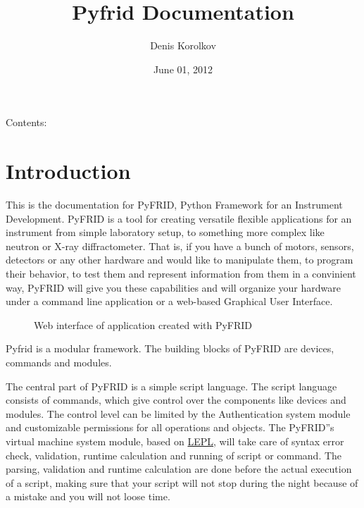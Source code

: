 \documentclass[letterpaper,10pt,english]{sphinxmanual}
\title{Pyfrid Documentation}
\date{June 01, 2012}
\author{Denis Korolkov}
\begin{document}
\maketitle
\tableofcontents
{}\label{index::doc}


Contents:


\chapter{Introduction}
\label{intro:introduction}\label{intro::doc}\label{intro:welcome-to-pyfrid-s-documentation}
This is the documentation for PyFRID, Python Framework for an Instrument Development.
PyFRID is a tool for creating versatile flexible applications for an instrument from simple
laboratory setup, to something more complex like neutron or X-ray diffractometer.
That is, if you have a bunch of motors, sensors, detectors or any other hardware and would like
to manipulate them, to program their behavior, to test them and represent information from them in a convinient way,
PyFRID will give you these capabilities and will organize your hardware under a command line application
or a web-based Graphical User Interface.
\begin{figure}[htbp]\begin{flushright}
\capstart

\caption{Web interface of application created with PyFRID}\end{flushright}\end{figure}

Pyfrid is a modular framework. The building blocks of PyFRID are devices, commands and modules.

The central part of PyFRID is a simple script language. The script language consists of commands,
which give control over the components like devices and modules.
The control level can be limited by the Authentication system module and customizable
permissions for all operations and objects. The PyFRID''s virtual machine system module, based on \href{http://www.acooke.org/lepl}{LEPL},
will take care of syntax error check, validation, runtime calculation and running of script or command.
The parsing, validation and runtime calculation are done before the actual execution of a script,
making sure that your script will not stop during the night because of a mistake and you will not loose time.
\end{document}
